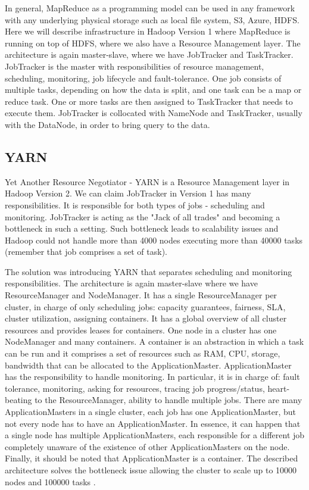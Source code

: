 In general, MapReduce as a programming model can be used in any framework with any underlying physical storage such as local file system, S3, Azure, HDFS. Here we will describe infrastructure in Hadoop Version 1 where MapReduce is running on top of HDFS, where we also have a Resource Management layer. The architecture is again master-slave, where we have JobTracker and TaskTracker. JobTracker is the master with responsibilities of resource management, scheduling, monitoring, job lifecycle and fault-tolerance. One job consists of multiple tasks, depending on how the data is split, and one task can be a map or reduce task. One or more tasks are then assigned to TaskTracker that needs to execute them. JobTracker is collocated with NameNode and TaskTracker, usually with the DataNode, in order to bring query to the data. 

\subsection{YARN}
Yet Another Resource Negotiator -  YARN \cite{YARN} is a Resource Management layer in Hadoop Version 2. We can claim JobTracker in Version 1 has many responsibilities. It is responsible for both types of jobs - scheduling and monitoring. JobTracker is acting as the "Jack of all trades" and becoming a bottleneck in such a setting. Such bottleneck leads to scalability issues and Hadoop could not handle more than 4000 nodes executing more than 40000 tasks (remember that job comprises a set of task). 

The solution was introducing YARN that separates scheduling and monitoring responsibilities. The architecture is again master-slave where we have ResourceManager and NodeManager. It has a single ResourceManager per cluster, in charge of only scheduling jobs: capacity guarantees, fairness, SLA, cluster utilization, assigning containers. It has a global overview of all cluster resources and provides leases for containers. One node in a cluster has one NodeManager and many containers. A container is an abstraction in which a task can be run and it comprises a set of resources such as RAM, CPU, storage, bandwidth that can be allocated to the ApplicationMaster. ApplicationMaster has the responsibility to handle monitoring. In particular, it is in charge of: fault tolerance, monitoring, asking for resources, tracing job progress/status, heart-beating to the ResourceManager, ability to handle multiple jobs. There are many ApplicationMasters in a single cluster, each job has one ApplicationMaster, but not every node has to have an ApplicationMaster. In essence, it can happen that a single node has multiple ApplicationMasters, each responsible for a different job completely unaware of the existence of other ApplicationMasters on the node. Finally, it should be noted that ApplicationMaster is a container. The described architecture solves the bottleneck issue allowing the cluster to scale up to 10000 nodes and 100000 tasks \cite{BigDataCourse}. %

